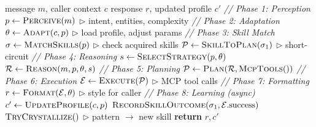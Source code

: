\documentclass{article}
\begin{document}
\begin{algorithm}[t]
  \caption{STEM Cognitive Pipeline}
  \label{alg:pipeline}
  \begin{algorithmic}
     message $m$, caller context $c$
     response $r$, updated profile $c'$
    \STATE
    \STATE \textit{// Phase 1: Perception}
    \STATE $p \leftarrow \textsc{Perceive}(m)$ \hfill $\triangleright$ intent, entities, complexity
    \STATE
    \STATE \textit{// Phase 2: Adaptation}
    \STATE $\theta \leftarrow \textsc{Adapt}(c, p)$ \hfill $\triangleright$ load profile, adjust params
    \STATE
    \STATE \textit{// Phase 3: Skill Match}
    \STATE $\sigma \leftarrow \textsc{MatchSkills}(p)$ \hfill $\triangleright$ check acquired skills
      \STATE $\mathcal{P} \leftarrow \textsc{SkillToPlan}(\sigma_1)$ \hfill $\triangleright$ short-circuit
    \ELSE
      \STATE \textit{// Phase 4: Reasoning}
      \STATE $s \leftarrow \textsc{SelectStrategy}(p, \theta)$
      \STATE $\mathcal{R} \leftarrow \textsc{Reason}(m, p, \theta, s)$
      \STATE \textit{// Phase 5: Planning}
      \STATE $\mathcal{P} \leftarrow \textsc{Plan}(\mathcal{R}, \textsc{McpTools}())$
    \ENDIF
    \STATE
    \STATE \textit{// Phase 6: Execution}
    \STATE $\mathcal{E} \leftarrow \textsc{Execute}(\mathcal{P})$ \hfill $\triangleright$ MCP tool calls
    \STATE
    \STATE \textit{// Phase 7: Formatting}
    \STATE $r \leftarrow \textsc{Format}(\mathcal{E}, \theta)$ \hfill $\triangleright$ style for caller
    \STATE
    \STATE \textit{// Phase 8: Learning (async)}
    \STATE $c' \leftarrow \textsc{UpdateProfile}(c, p)$
    \STATE $\textsc{RecordSkillOutcome}(\sigma_1, \mathcal{E}.\text{success})$
    \STATE $\textsc{TryCrystallize}()$ \hfill $\triangleright$ pattern $\to$ new skill
    \STATE \textbf{return} $r, c'$
  \end{algorithmic}
\end{algorithm}
\end{document}

